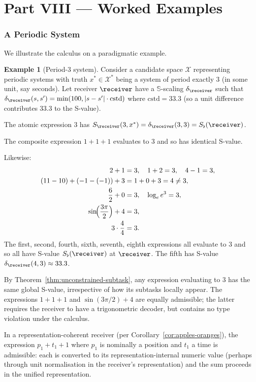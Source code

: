 \documentclass[11pt,a4paper]{article}
\theoremstyle{thmstyle}
\theoremstyle{thmstyle}
\theoremstyle{definition}
\newtheorem{example}[theorem]{Example}
\theoremstyle{remark}
\newcommand{\Sscale}{\mathbb{S}}
\newcommand{\Cands}{\mathcal{X}}
\newcommand{\Truth}{\mathcal{X}^{*}}
\newcommand{\Sscalar}{S}
\newcommand{\Sfloor}{S_{\flat}}
\begin{document}
\clearpage

\part*{Part VIII --- Worked Examples}

\section{A Periodic System}
\label{sec:periodic-example}

We illustrate the calculus on a paradigmatic example.

\begin{example}[Period-3 system]\label{ex:period-3}
Consider a candidate space $\Cands$ representing
periodic systems with truth $x^{*} \in \Truth$ being
a system of period exactly $3$ (in some unit, say
seconds).  Let receiver $\receiver$ have a
$\Sscale$-scaling $\delta_{\receiver}$ such that
$\delta_{\receiver}(s, s') = \min(100, |s - s'|
\cdot \mathrm{cstd})$ where $\mathrm{cstd} = 33.3$
(so a unit difference contributes $33.3$ to the
S-value).

The atomic expression $3$ has
$\Sscalar_{\receiver}(3, x^{*}) = \delta_{\receiver}
(3, 3) = \Sfloor(\receiver)$.

The composite expression $1 + 1 + 1$ evaluates to
$3$ and so has identical S-value.

Likewise:
\begin{align*}
2 + 1 &= 3, \quad 1 + 2 = 3, \quad 4 - 1 = 3, \\
(11 - 10) + (-1 - (-1)) + 3 &= 1 + 0 + 3 = 4 \neq 3, \\
\frac{6}{2} + 0 &= 3, \quad \log_{e} e^{3} = 3, \\
\sin\!\Bigl(\frac{3\pi}{2}\Bigr) + 4 &= 3, \\
3 \cdot \frac{4}{4} &= 3.
\end{align*}
The first, second, fourth, sixth, seventh, eighth
expressions all evaluate to $3$ and so all have
S-value $\Sfloor(\receiver)$ at $\receiver$.  The
fifth has S-value
$\delta_{\receiver}(4, 3) \approx 33.3$.

By Theorem~\ref{thm:unconstrained-subtask}, any
expression evaluating to $3$ has the same global
S-value, irrespective of how its subtasks
locally appear.  The expressions
$1 + 1 + 1$ and $\sin(3\pi/2) + 4$ are equally
admissible; the latter requires the receiver to
have a trigonometric decoder, but contains no
type violation under the calculus.

In a representation-coherent receiver
(per Corollary~\ref{cor:apples-oranges}), the
expression $p_{1} + t_{1} + 1$ where $p_{1}$ is
nominally a position and $t_{1}$ a time is
admissible: each is converted to its
representation-internal numeric value (perhaps
through unit normalisation in the receiver's
representation) and the sum proceeds in the unified
representation.
\end{example}
\end{document}
